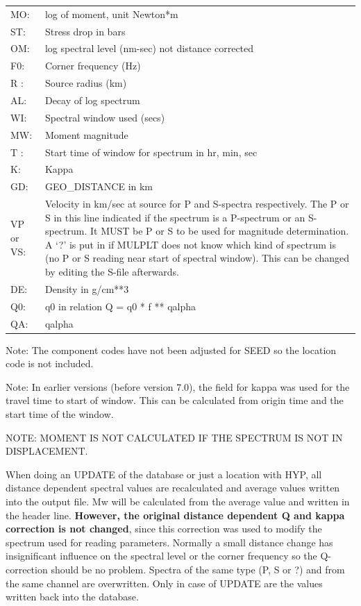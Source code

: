\begin{tabular}{|lp{9cm}|}
\hline
MO: & log of moment, unit Newton*m \\
ST: & Stress drop in bars \\
OM: & log spectral level (nm-sec) %
not distance corrected \\
F0: & Corner frequency (Hz) \\
R : & Source radius (km) \\
AL: & Decay of log spectrum \\
WI: & Spectral window used (secs) \index{Corner frequency} \\
MW: & Moment magnitude \index{Moment} \\
T : & Start time of window for spectrum in hr, min, sec \\
K: & Kappa \index{Stress drop} \\
GD: & GEO\_DISTANCE in km \\
VP or VS: & Velocity in km/sec at source for P and S-spectra 
respectively. The P or S in this line 
indicated if the spectrum is a P-spectrum or an S-spectrum. 
It MUST be P or S to be used for magnitude determination. 
A `?' is put in if MULPLT does not know which kind of spectrum is (no P or S reading near start of spectral window). This can be changed by editing the S-file afterwards. \\
DE: & Density in g/cm**3 \\
Q0: & q0 in relation Q = q0 * f ** qalpha \\
QA: & qalpha \\
\hline
\end{tabular}
\newline


Note: The component codes have not been adjusted for SEED so the location code is not included. 

Note: In earlier versions (before version 7.0), the field for kappa was used for the travel time to start of window. This can be calculated from origin time and the start time of the window. 

NOTE: MOMENT IS NOT CALCULATED IF THE SPECTRUM IS NOT IN DISPLACEMENT. 

When doing an UPDATE of the database or just a location with HYP, all distance dependent spectral values are recalculated and average values written into the output file. Mw will be calculated from the average value and written in the header line. \textbf{However, the original distance dependent Q and kappa correction is not changed}, since this correction was used to modify the spectrum used for reading parameters. Normally a small distance change has insignificant influence on the spectral level or the corner frequency so the Q-correction should be no problem. Spectra of the same type (P, S or ?) and from the same channel are overwritten. Only in case of UPDATE are the values written back into the database. 

